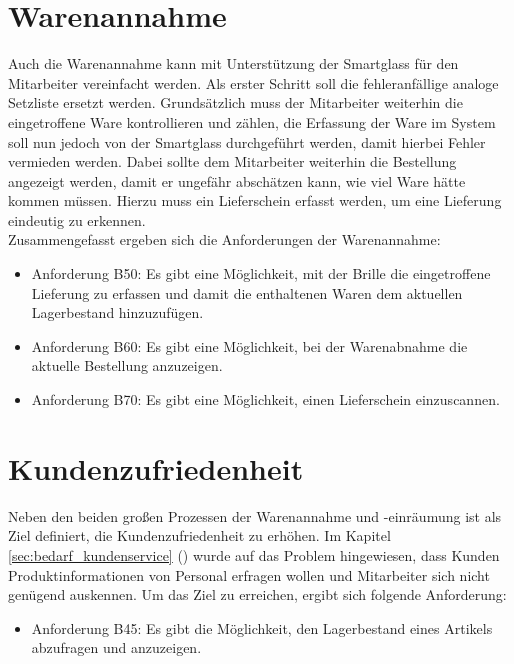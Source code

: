 \section{Warenannahme}
Auch die Warenannahme kann mit Unterstützung der Smartglass für den Mitarbeiter vereinfacht werden. Als erster Schritt soll die fehleranfällige analoge Setzliste ersetzt werden. Grundsätzlich muss der Mitarbeiter weiterhin die eingetroffene Ware kontrollieren und zählen, die Erfassung der Ware im System soll nun jedoch von der Smartglass durchgeführt werden, damit hierbei Fehler vermieden werden. Dabei sollte dem Mitarbeiter weiterhin die Bestellung angezeigt werden, damit er ungefähr abschätzen kann, wie viel Ware hätte kommen müssen. Hierzu muss \zB ein Lieferschein erfasst werden, um eine Lieferung eindeutig zu erkennen.\\
Zusammengefasst ergeben sich die Anforderungen der Warenannahme: 

\begin{itemize}
	\item Anforderung B50: Es gibt eine Möglichkeit, mit der Brille die eingetroffene Lieferung zu erfassen und damit die enthaltenen Waren dem aktuellen Lagerbestand hinzuzufügen. \label{anforderung_b50}
	\item Anforderung B60: Es gibt eine Möglichkeit, bei der Warenabnahme die aktuelle Bestellung anzuzeigen. \label{anforderung_b60}
	\item Anforderung B70: Es gibt eine Möglichkeit, einen Lieferschein einzuscannen. \label{anforderung_b70}
\end{itemize}

\section{Kundenzufriedenheit}
Neben den beiden großen Prozessen der Warenannahme und -einräumung ist als Ziel definiert, die Kundenzufriedenheit zu erhöhen. Im Kapitel \ref{sec:bedarf_kundenservice} () wurde auf das Problem hingewiesen, dass Kunden Produktinformationen von Personal erfragen wollen und Mitarbeiter sich nicht genügend auskennen. Um das Ziel zu erreichen, ergibt sich folgende Anforderung: 
\begin{itemize}
	\item Anforderung B45: Es gibt die Möglichkeit, den Lagerbestand eines Artikels abzufragen und anzuzeigen. \label{anforderung_b45}
\end{itemize}


